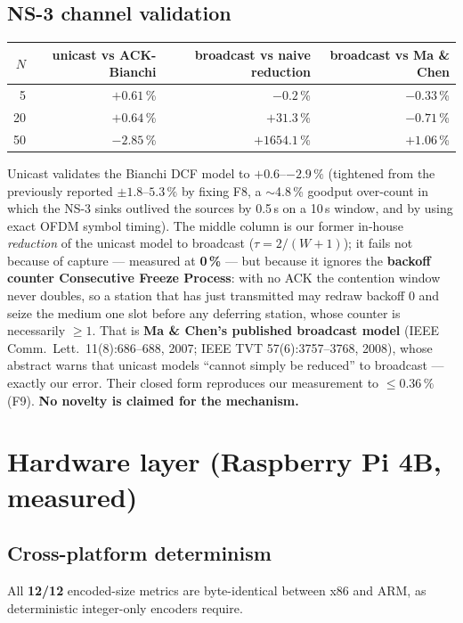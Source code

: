 \documentclass[11pt,a4paper]{article}
\begin{document}
\subsection{NS-3 channel validation}
\begin{center}\begin{tabular}{rrrr}
\toprule $N$ & unicast vs ACK-Bianchi & broadcast vs naive reduction & broadcast vs Ma \& Chen \\ \midrule
5 & $+0.61$\,\% & $-0.2$\,\% & $-0.33$\,\% \\
20 & $+0.64$\,\% & $+31.3$\,\% & $-0.71$\,\% \\
50 & $\mathbf{-2.85}$\,\% & $\mathbf{+1654.1}$\,\% & $\mathbf{+1.06}$\,\% \\ \bottomrule
\end{tabular}\end{center}
Unicast validates the Bianchi DCF model to $+0.6$--$-2.9\,\%$ (tightened from the previously
reported $\pm1.8$--$5.3\,\%$ by fixing F8, a $\sim$4.8\,\% goodput over-count in which the NS-3 sinks
outlived the sources by 0.5\,s on a 10\,s window, and by using exact OFDM symbol timing). The middle
column is our former in-house \emph{reduction} of the unicast model to broadcast ($\tau=2/(W{+}1)$);
it fails not because of capture --- measured at \textbf{0\,\%} --- but because it ignores the
\textbf{backoff counter Consecutive Freeze Process}: with no ACK the contention window never doubles,
so a station that has just transmitted may redraw backoff 0 and seize the medium one slot before any
deferring station, whose counter is necessarily $\ge1$. That is \textbf{Ma \& Chen's published
broadcast model} (IEEE Comm.\ Lett.\ 11(8):686--688, 2007; IEEE TVT 57(6):3757--3768, 2008), whose
abstract warns that unicast models ``cannot simply be reduced'' to broadcast --- exactly our error.
Their closed form reproduces our measurement to $\le0.36\,\%$ (F9). \textbf{No novelty is claimed for
the mechanism.}

\section{Hardware layer (Raspberry Pi 4B, measured)}

\subsection{Cross-platform determinism}
All \textbf{12/12} encoded-size metrics are byte-identical between x86 and ARM, as deterministic
integer-only encoders require.
\end{document}
